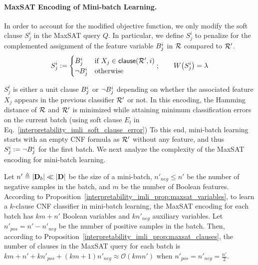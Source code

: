 \paragraph{MaxSAT Encoding of Mini-batch Learning.}
\label{interpretability_imli_sec:encoding_incremental}
In order to account for the modified objective function, we only modify the soft clause $ S_j^i $ in the MaxSAT query $ Q $. In particular, we define $ S_j^i $ to penalize for the complemented assignment  of the feature variable $ B_j^i $ in $ {\mathcal{R}} $ compared to $ {\mathcal{R}}' $.
\[
S_j^i:=
\begin{cases}
B_j^i& \text{if }  X_j \in  \mathsf{clause}({\mathcal{R}}',i)  \\
\neg B_j^i & \text{otherwise}
\end{cases};\qquad W \! \left( S_j^i \right)=\lambda
\]

$ S_j^i $ is either a unit clause $ B_j^i $ or $ \neg B_j^i $ depending on whether the associated feature $ X_j $ appears in the previous classifier $ {\mathcal{R}}' $ or not. In this encoding, the Hamming distance of $ {\mathcal{R}} $ and $ {\mathcal{R}}' $ is minimized while attaining minimum classification errors on the current batch (using soft clause $ E_l $ in Eq.~\eqref{interpretability_imli_soft_clause_error}) To this end,  mini-batch learning starts with an empty CNF formula as $ {\mathcal{R}}' $ without any feature, and thus $ S_j^i := \neg B_j^i $ for the first batch. We next analyze the complexity of the MaxSAT encoding for mini-batch learning. 


\begin{proposition}
	\label{interpretability_imli_prop:maxsat_complexity_incremental}
	Let $ n' \triangleq |\mathbf{D}_b| \ll |\mathbf{D}| $ be the size of a mini-batch, $ n'_{neg} \le n' $ be the number of negative samples in the batch, and $ m $ be the number of Boolean features. According to Proposition~\ref{interpretability_imli_prop:maxsat_variables}, to learn a $ k $-clause CNF classifier in mini-batch learning, the MaxSAT encoding for each batch has $ km + n' $ Boolean variables and $ kn'_{neg} $ auxiliary variables. Let $ n'_{pos} = n' - n'_{neg} $ be the number of positive samples in the batch. Then, according to Proposition~\ref{interpretability_imli_prop:maxsat_clauses}, the number of clauses in the MaxSAT query for each batch is $ k m+n'+k n'_{pos}+(k m+1)n'_{neg} \approx \mathcal{O}(k m  n' ) $ when $ n'_{pos}= n'_{neg} =\frac{n'}{2} $.
\end{proposition}



%

